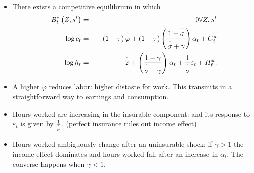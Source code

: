 \documentclass[notes=show]{beamer}
\begin{document}
\begin{frame}%



\begin{itemize}
\item There exists a competitive equilibrium in which%
\begin{eqnarray}
B_{t}^{\ast }\left( Z,s^{t}\right) &=&0\forall Z,s^{t} \\
\log c_{t} &=&-\left( 1-\tau \right) \overset{\symbol{94}}{\varphi }+\left(
1-\tau \right) \left( \frac{1+\overset{\symbol{94}}{\sigma }}{\overset{%
\symbol{94}}{\sigma }+\gamma }\right) \alpha _{t}+C_{t}^{a}  \notag \\
\log h_{t} &=&-\overset{\symbol{94}}{\varphi }+\left( \frac{1-\gamma }{%
\overset{\symbol{94}}{\sigma }+\gamma }\right) \alpha _{t}+\frac{1}{\overset{%
\symbol{94}}{\sigma }}\varepsilon _{t}+H_{t}^{a}.  \notag
\end{eqnarray}
\end{itemize}

\transboxout%
\end{frame}%

\bigskip

\begin{frame}%



\begin{itemize}
\item A higher $\varphi $ reduces labor: higher distaste for work. This
transmits in a straightforward way to earnings and consumption.

\item Hours worked are increasing in the insurable component: and its
response to $\varepsilon _{t}$ is given by $\frac{1}{\overset{\symbol{94}}{%
\sigma }}$. (perfect insurance rules out income effect)

\item Hours worked ambiguously change after an uninsurable shock: if $\gamma
>1$ the income effect dominates and hours worked fall after an increase in $%
\alpha _{t}$. The converse happens when $\gamma <1$.
\end{itemize}

\transboxout%
\end{frame}%
\end{document}
